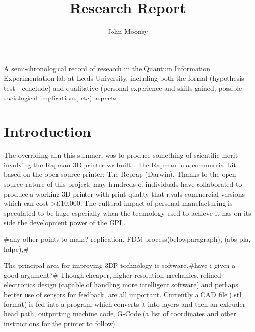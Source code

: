 \documentclass{article}
\newenvironment{tmparmod}[3]{\begin{list}{}{\setlength{\topsep}{0pt}\setlength{\leftmargin}{#1}\setlength{\rightmargin}{#2}\setlength{\parindent}{#3}\setlength{\listparindent}{\parindent}\setlength{\itemindent}{\parindent}\setlength{\parsep}{\parskip}} \item[]}{\end{list}}
\begin{document}
\title{Research Report}\author{John Mooney}\maketitle

\begin{center}
  \begin{tmparmod}{0pt}{0pt}{1em}
    \begin{tmparmod}{0pt}{2cm}{0pt}
      \begin{tmparmod}{2cm}{0pt}{0pt}
        A semi-chronological record of research in the Quantum Information
        Experimentation lab at Leeds University, including both the formal
        (hypothesis - test - conclude) and qualitative (personal experience
        and skills gained, possible sociological implications, etc) aspects. 
      \end{tmparmod}
    \end{tmparmod}
  \end{tmparmod}
\end{center}





{\tableofcontents}

{\newpage}

\section{Introduction}

The overriding aim this summer, was to produce something of scientific merit
involving the Rapman 3D printer we built . The Rapman is a commercial kit
based on the open source printer; The Reprap (Darwin). Thanks to the open
source nature of this project, may hundreds of individuals have collaborated
to produce a working 3D printer with print quality that rivals commercial
versions which can cost >{\pounds}10,000. The cultural impact of personal
manufacturing is speculated to be huge  especially when the technology used to
achieve it has on its side the development power of the GPL{\nobreak}.

\#any other points to make? replication, FDM process(belowparagraph), (abs
pla, hdpe),\#

The principal area for improving 3DP technology is software.\#have i given a
good argument?\# Though cheaper, higher resolution mechanics, refined
electronics design (capable of handling more intelligent software) and perhaps
better use of sensors for feedback, are all important. Currently a CAD file
(.stl format) is fed into a program which converts it into layers and then an
extruder head path, outputting machine code, G-Code (a list of coordinates and
other instructions for the printer to follow).
\end{document}
